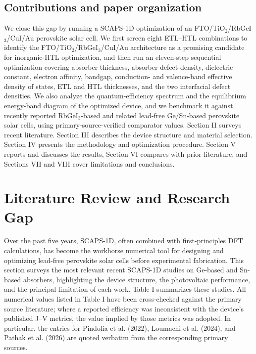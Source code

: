 \documentclass[review]{elsarticle}
\begin{document}
\subsection{Contributions and paper organization}
We close this gap by running a SCAPS-1D optimization of an FTO/\allowbreak{}TiO$_{2}$/RbGeI$_{3}$/CuI/\allowbreak{}Au perovskite solar cell. We first screen eight ETL--HTL combinations to identify the FTO/\allowbreak{}TiO$_{2}$/RbGeI$_{3}$/CuI/\allowbreak{}Au architecture as a promising candidate for inorganic-HTL optimization, and then run an eleven-step sequential optimization covering absorber thickness, absorber defect density, dielectric constant, electron affinity, bandgap, conduction- and valence-band effective density of states, ETL and HTL thicknesses, and the two interfacial defect densities. We also analyze the quantum-efficiency spectrum and the equilibrium energy-band diagram of the optimized device, and we benchmark it against recently reported RbGeI$_{3}$-based and related lead-free Ge/Sn-based perovskite solar cells, using primary-source-verified comparator values.
Section II surveys recent literature. Section III describes the device structure and material selection. Section IV presents the methodology and optimization procedure. Section V reports and discusses the results, Section VI compares with prior literature, and Sections VII and VIII cover limitations and conclusions.

\section{Literature Review and Research Gap}
Over the past five years, SCAPS-1D, often combined with first-principles DFT calculations, has become the workhorse numerical tool for designing and optimizing lead-free perovskite solar cells before experimental fabrication. This section surveys the most relevant recent SCAPS-1D studies on Ge-based and Sn-based absorbers, highlighting the device structure, the photovoltaic performance, and the principal limitation of each work. Table I summarizes these studies. All numerical values listed in Table I have been cross-checked against the primary source literature; where a reported efficiency was inconsistent with the device's published J--V metrics, the value implied by those metrics was adopted. In particular, the entries for Pindolia et al. (2022), Loumachi et al. (2024), and Pathak et al. (2026) are quoted verbatim from the corresponding primary sources.
\end{document}
